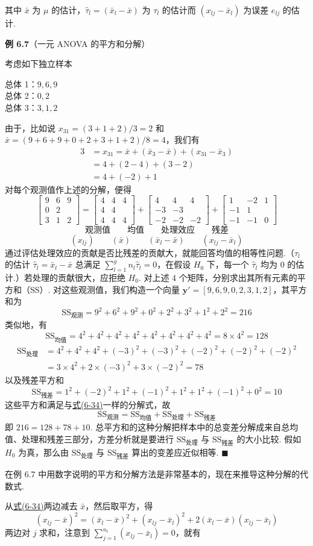 其中 $\bar{x}$ 为 $\mu$ 的估计，$\hat{\tau}_l=(\bar{x}_l-\bar{x})$ 为 $\tau_l$ 的估计而 $(x_{lj}-\bar{x}_l)$ 为误差 $e_{lj}$ 的估计.

\noindent\textbf{例 6.7}\quad （一元 ANOVA 的平方和分解）

考虑如下独立样本

总体 1：$9,6,9$\\
总体 2：$0,2$\\
总体 3：$3,1,2$

由于，比如说 $x_{31}=(3+1+2)/3=2$ 和 $\bar{x}=(9+6+9+0+2+3+1+2)/8=4$，我们有
\begin{align*}
3&=x_{31}=\bar{x}+(\bar{x}_3-\bar{x})+(x_{31}-\bar{x}_3)\\
&=4+(2-4)+(3-2)\\
&=4+(-2)+1
\end{align*}
对每个观测值作上述的分解，便得
\[
\begin{bmatrix}9&6&9\\0&2&\\3&1&2\end{bmatrix}=\begin{bmatrix}4&4&4\\4&4&\\4&4&4\end{bmatrix}+\begin{bmatrix}4&4&4\\-3&-3&\\-2&-2&-2\end{bmatrix}+\begin{bmatrix}1&-2&1\\-1&1&\\-1&-1&0\end{bmatrix}
\]
\[
\text{观测值}\qquad\text{均值}\qquad\text{处理效应}\qquad\text{残差}
\]
\[
(x_{lj})\qquad(\bar{x})\qquad(\bar{x}_l-\bar{x})\qquad(x_{lj}-\bar{x}_l)
\]
通过评估处理效应的贡献是否比残差的贡献大，就能回答均值的相等性问题.（$\tau_l$ 的估计 $\hat{\tau}_l=\bar{x}_l-\bar{x}$ 总满足 $\sum\limits_{l=1}^g n_l\hat{\tau}_l=0$，在假设 $H_0$ 下，每一个 $\hat{\tau}_l$ 均为 0 的估计.）若处理的贡献很大，应拒绝 $H_0$. 对上述 4 个矩阵，分别求出其所有元素的平方和（SS）. 对这些观测值，我们构造一个向量 $\mathbf{y}'=[9,6,9,0,2,3,1,2]$，其平方和为
\[
\mathrm{SS}_{\text{观测}}=9^2+6^2+9^2+0^2+2^2+3^2+1^2+2^2=216
\]
类似地，有
\[
\mathrm{SS}_{\text{均值}}=4^2+4^2+4^2+4^2+4^2+4^2+4^2+4^2=8\times 4^2=128
\]
\begin{align*}
\mathrm{SS}_{\text{处理}}&=4^2+4^2+4^2+(-3)^2+(-3)^2+(-2)^2+(-2)^2+(-2)^2\\
&=3\times 4^2+2\times(-3)^2+3\times(-2)^2=78
\end{align*}
以及残差平方和
\[
\mathrm{SS}_{\text{残差}}=1^2+(-2)^2+1^2+(-1)^2+1^2+1^2+(-1)^2+0^2=10
\]
这些平方和满足与\hyperref[eq:6-34]{式(6-34)}一样的分解式，故
\[
\mathrm{SS}_{\text{观测}}=\mathrm{SS}_{\text{均值}}+\mathrm{SS}_{\text{处理}}+\mathrm{SS}_{\text{残差}}
\]
即 $216=128+78+10$. 总平方和的这种分解把样本中的总变差分解成来自总均值、处理和残差三部分，方差分析就是要进行 $\mathrm{SS}_{\text{处理}}$ 与 $\mathrm{SS}_{\text{残差}}$ 的大小比较. 假如 $H_0$ 为真，那么由 $\mathrm{SS}_{\text{处理}}$ 与 $\mathrm{SS}_{\text{残差}}$ 算出的变差应近似相等. \hfill$\blacksquare$

在例 6.7 中用数字说明的平方和分解方法是非常基本的，现在来推导这种分解的代数式.

从\hyperref[eq:6-34]{式(6-34)}两边减去 $\bar{x}$，然后取平方，得
\[
(x_{lj}-\bar{x})^2=(\bar{x}_l-\bar{x})^2+(x_{lj}-\bar{x}_l)^2+2(\bar{x}_l-\bar{x})(x_{lj}-\bar{x}_l)
\]
两边对 $j$ 求和，注意到 $\sum\limits_{j=1}^{n_l}(x_{lj}-\bar{x}_l)=0$，就有
